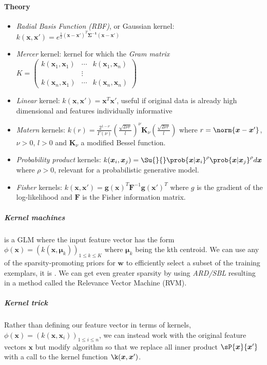 \paragraph{Theory}
\begin{itemize}
    \item \emph{Radial Basis Function (RBF)}, or Gaussian kernel:  $k(\bm{x}, \bm{x}')
        = e^{\frac{1}{2}(\bm{x} - \bm{x}')^{T}\bm{\Sigma^{-1}}(\bm{x} - \bm{x}')}$
    \item \emph{Mercer} kernel: kernel for which the \emph{Gram matrix} 
        $K=\begin{pmatrix}
            k(\bm{x}_{1}, \bm{x}_{1}) & \cdots & k(\bm{x}_{1}, \bm{x}_{n}) \\
                                      & \vdots &\\
            k(\bm{x}_{n}, \bm{x}_{1}) & \cdots & k(\bm{x}_{n}, \bm{x}_{n}) 
        \end{pmatrix}$ 
    \item \emph{Linear} kernel: $k(\bm{x},\bm{x}') = \bm{x}^{T}\bm{x}'$, useful if 
        original data is already high dimensional and features individually informative
    \item \emph{Matern} kernels: $k(r) = \frac{2^{1-\nu}}{\Gamma(\nu)}\left(\frac{
        \sqrt{2\nu r}}{l}\right)^{\nu}\bm{K}_{\nu}\left(\frac{\sqrt{2\nu r}}{l}\right)$
        where $r=\norm{\bm{x} - \bm{x}'}$, $\nu >0$, $l>0$ and $\bm{K}_{\nu}$ a 
        modified Bessel function. 
    \item \emph{Probability product} kernels: $k(\bm{x}_{i},\bm{x}_{j}) = 
        \Su{}{}\prob{\bm{x}|\bm{x}_{i}}^{\rho}\prob{\bm{x}|\bm{x}_{j}}^{\rho}d\bm{x}$
        where $\rho > 0$, relevant for a probabilistic generative model.
    \item \emph{Fisher} kernels: $k(\bm{x},\bm{x}') = \bm{g}(\bm{x})^{T}\bm{F}^{-1}
        \bm{g}(\bm{x}')^{T}$ where $g$ is the gradient of the log-likelihood and 
        $\bm{F}$ is the Fisher information matrix. 
\end{itemize}
\subparagraph{Kernel machines}
is a GLM where the input feature vector has the form $\phi(\bm{x}) = \left(
k(\bm{x}, \bm{\mu}_{k})\right)_{1\leq k\leq K}$ where $\bm{\mu}_{k}$ being the kth 
centroid.
We can use any of the sparsity-promoting priors for $\bm{w}$ to efficiently select a 
subset of the training exemplars, it is .
We can get even greater sparsity by using \emph{ARD/SBL} resulting in a method called
the Relevance Vector Machine (RVM).
\subparagraph{Kernel trick}
Rather than defining our feature vector in terms of kernels, $\phi(\bm{x}) = \left(
k(\bm{x},\bm{x}_{i})\right)_{1\leq i\leq n}$, we can instead work with the original 
feature vectors $\bm{x}$ but modify algorithm so that we replace all inner product 
$\sP{\bm{x}}{\bm{x}'}$ with a call to the kernel function $\k(\bm{x}, \bm{x}')$.


